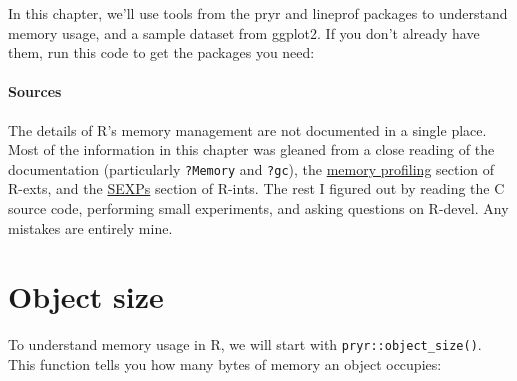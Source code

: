In this chapter, we'll use tools from the pryr and lineprof packages to
understand memory usage, and a sample dataset from ggplot2. If you don't
already have them, run this code to get the packages you need:

\begin{Shaded}
\begin{Highlighting}[]
\NormalTok{(}\NormalTok{)}
\NormalTok{(}\NormalTok{)}
\NormalTok{(}\NormalTok{)}
\OperatorTok{::}\NormalTok{(}\NormalTok{)}
\end{Highlighting}
\end{Shaded}

\hypertarget{sources}{%
\paragraph{Sources}\label{sources}}

The details of R's memory management are not documented in a single
place. Most of the information in this chapter was gleaned from a close
reading of the documentation (particularly \texttt{?Memory} and
\texttt{?gc}), the
\href{http://cran.r-project.org/doc/manuals/R-exts.html\#Profiling-R-code-for-memory-use}{memory
profiling} section of R-exts, and the
\href{http://cran.r-project.org/doc/manuals/R-ints.html\#SEXPs}{SEXPs}
section of R-ints. The rest I figured out by reading the C source code,
performing small experiments, and asking questions on R-devel. Any
mistakes are entirely mine.

\hypertarget{object-size}{%
\section{Object size}\label{object-size}}

To understand memory usage in R, we will start with
\texttt{pryr::object\_size()}. This function tells you how many bytes of
memory an object occupies: 

\begin{Shaded}
\begin{Highlighting}[]
\NormalTok{(}\OperatorTok{:}\NormalTok{)}
\end{Highlighting}
\end{Shaded}

